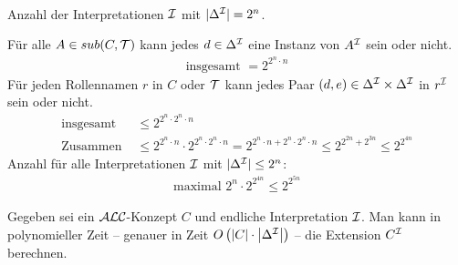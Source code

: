 \begin{tafel}\mbox{}\\
    Anzahl der Interpretationen $\mathcal{I}$ mit $|\Delta^{\mathcal{I}}| = 2^n$.
    
    Für alle $A \in sub(C, \mathcal{T})$ kann jedes $d \in \Delta^{\mathcal{I}}$ eine Instanz von $A^{\mathcal{I}}$ sein oder nicht.
    \begin{align*}
        \text{insgesamt } = 2^{2^{n} \cdot n}
    \end{align*}
    Für jeden Rollennamen $r$ in $C$ oder $\mathcal{T}$ kann jedes Paar $(d, e) \in \Delta^{\mathcal{I}} \times \Delta^{\mathcal{I}}$ in $r^{\mathcal{I}}$ sein oder nicht.
    \begin{align*}
        \text{insgesamt } &\leq 2^{2^n \cdot 2^n \cdot n}\\
        \text{Zusammen } &\leq 2^{2^n \cdot n} \cdot 2^{2^n \cdot 2^n \cdot n} = 2^{2^n \cdot n + 2^n \cdot 2^n \cdot n} \leq 2^{2^{2n} + 2^{3n}} \leq 2^{2^{4n}}
    \end{align*}
    Anzahl für alle Interpretationen $\mathcal{I}$ mit $|\Delta^{\mathcal{I}}| \leq 2^n$:
    \begin{align*}
        \text{maximal } 2^n \cdot 2^{2^{4n}} \leq 2^{2^{5n}}
    \end{align*}
\end{tafel}

\begin{lemma}
    \label{lem:extensionsberechnung}
Gegeben sei ein $\mathcal{A}\mathcal{L}\mathcal{C}$-Konzept $C$ und endliche Interpretation $\mathcal{I}$. Man kann in polynomieller Zeit -- genauer in Zeit $O\left( \left| C \right| \cdot \left| \Delta^{\mathcal{I}} \right| \right)$ -- die Extension $C^{\mathcal{I}}$ berechnen.
\end{lemma}


